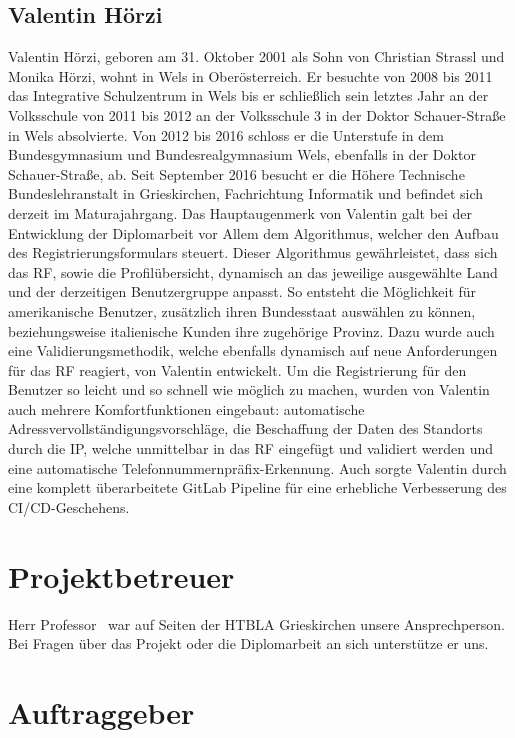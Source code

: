 \subsection{Valentin Hörzi}
Valentin Hörzi, geboren am 31. Oktober 2001 als Sohn von Christian Strassl und Monika Hörzi, wohnt in Wels in Oberösterreich. Er besuchte von 2008 bis 2011 das Integrative Schulzentrum in Wels bis er schließlich sein letztes Jahr an der Volksschule von 2011 bis 2012 an der Volksschule 3 in der Doktor Schauer-Straße in Wels absolvierte. Von 2012 bis 2016 schloss er die Unterstufe in dem Bundesgymnasium und Bundesrealgymnasium Wels, ebenfalls in der Doktor Schauer-Straße, ab. Seit September 2016 besucht er die Höhere Technische  Bundeslehranstalt in Grieskirchen, Fachrichtung Informatik und befindet sich derzeit im Maturajahrgang. Das Hauptaugenmerk von Valentin galt bei der Entwicklung der Diplomarbeit vor Allem dem Algorithmus, welcher den Aufbau des Registrierungsformulars steuert.
Dieser Algorithmus gewährleistet, dass sich das RF, sowie die Profilübersicht, dynamisch an das jeweilige ausgewählte Land und der derzeitigen Benutzergruppe anpasst. So entsteht die Möglichkeit für amerikanische Benutzer, zusätzlich ihren Bundesstaat auswählen zu können, beziehungsweise italienische Kunden ihre zugehörige Provinz. Dazu wurde auch eine Validierungsmethodik, welche ebenfalls dynamisch auf neue Anforderungen für das RF reagiert, von Valentin entwickelt. Um die Registrierung für den Benutzer so leicht und so schnell wie möglich zu machen, wurden von Valentin auch mehrere Komfortfunktionen eingebaut: automatische Adressvervollständigungsvorschläge, die Beschaffung der Daten des Standorts durch die IP, welche unmittelbar in das RF eingefügt und validiert werden und eine automatische Telefonnummernpräfix-Erkennung.
Auch sorgte Valentin durch eine komplett überarbeitete GitLab Pipeline für eine erhebliche Verbesserung des CI/CD-Geschehens.

\section{Projektbetreuer}

Herr Professor \ThSupervisorName \, war auf Seiten der HTBLA Grieskirchen unsere Ansprechperson. Bei Fragen über das Projekt oder die Diplomarbeit an sich unterstütze er uns.

\section{Auftraggeber}

